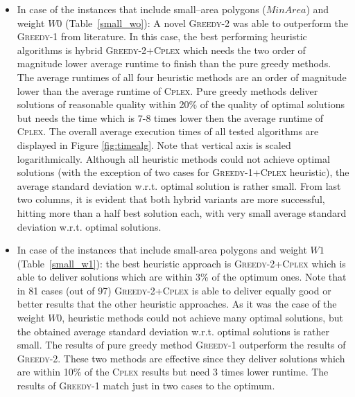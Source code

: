 \documentclass[runningheads,a4paper]{elsarticle}
\begin{document}
     \begin{itemize}
     	\item  In case of the instances that include small--area polygons ($MinArea$) and weight $W0$ (Table~\ref{small_wo}): A novel \textsc{Greedy-2} was able to  outperform the \textsc{Greedy-1} from literature. In this case, the best performing heuristic algorithms is hybrid \textsc{Greedy-2+Cplex} which needs the two order of magnitude lower average runtime to finish than the pure greedy methods. The average runtimes of all four heuristic methods are an order of magnitude lower than the average runtime of \textsc{Cplex}. Pure greedy methods deliver solutions of reasonable quality within 20\% of the quality of optimal solutions but needs the time which is 7-8 times lower then the average runtime of \textsc{Cplex}. The overall average execution times of all tested algorithms are displayed in Figure \ref{fig:timealg}. Note that vertical axis is scaled logarithmically. Although all heuristic methods could not achieve optimal solutions (with the exception of two cases for \textsc{Greedy-1+Cplex} heuristic), the average standard deviation w.r.t. optimal solution is rather small. From last two columns, it is evident that both hybrid variants are more successful, hitting more than a half best solution each, with very small average standard deviation w.r.t. optimal solutions.
     	\item  In case of the instances that include small-area polygons and weight $W1$ (Table~\ref{small_w1}): the best heuristic approach is \textsc{Greedy-2+Cplex} which is able to deliver solutions which are within 3\% of the optimum ones. Note that in 81 cases (out of 97) \textsc{Greedy-2+Cplex} is able to deliver equally good or better results that the other heuristic approaches. As it was the case  of the weight $W0$, heuristic methods could not achieve many optimal solutions, but the obtained  average standard deviation w.r.t. optimal solutions is rather small.
     	The results of pure greedy method \textsc{Greedy-1} outperform the results of \textsc{Greedy-2}. These two methods are effective since they deliver solutions which are within 10\% of the \textsc{Cplex} results but need 3 times lower runtime. The results of \textsc{Greedy-1} match just in two cases to the optimum.
     	

\end{itemize}
\end{document}
